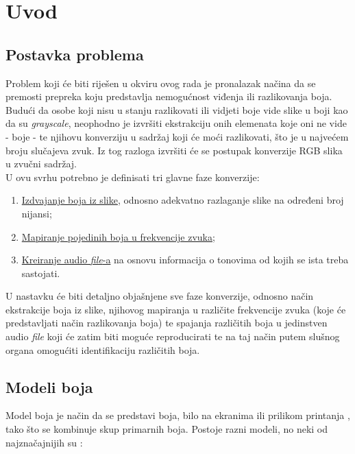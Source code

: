 \documentclass[12pt,a4paper]{article}
\begin{document}
\section{Uvod}

\subsection{Postavka problema}

Problem koji će biti riješen u okviru ovog rada je pronalazak načina da se premosti prepreka koju predstavlja nemogućnost viđenja ili razlikovanja boja. Budući da osobe koji nisu u stanju razlikovati ili vidjeti boje vide slike u boji kao da su \textit{grayscale}, neophodno je izvršiti ekstrakciju onih elemenata koje oni ne vide - boje - te njihovu konverziju u sadržaj koji će moći razlikovati, što je u najvećem broju slučajeva zvuk. Iz tog razloga izvršiti će se postupak konverzije RGB slika u zvučni sadržaj. \\

U ovu svrhu potrebno je definisati tri glavne faze konverzije:

\begin{enumerate}

\item \underline{Izdvajanje boja iz slike}, odnosno adekvatno razlaganje slike na određeni broj nijansi;
\item \underline{Mapiranje pojedinih boja u frekvencije zvuka};
\item \underline{Kreiranje audio \textit{file}-a} na osnovu informacija o tonovima od kojih se ista treba sastojati.

\end{enumerate}

U nastavku će biti detaljno objašnjene sve faze konverzije, odnosno način ekstrakcije boja iz slike, njihovog mapiranja u različite frekvencije zvuka (koje će predstavljati način razlikovanja boja) te spajanja različitih boja u jedinstven audio \textit{file} koji će zatim biti moguće reproducirati te na taj način putem slušnog organa omogućiti identifikaciju različitih boja.

\subsection{Modeli boja}

Model boja je način da se predstavi boja, bilo na ekranima ili prilikom printanja \cite{bels1}, tako što se kombinuje skup primarnih boja. Postoje razni modeli, no neki od najznačajnijih su \cite{bels2}:
\end{document}
